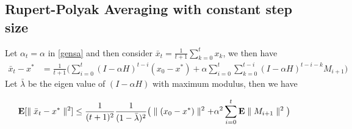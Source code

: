 \subsection{Rupert-Polyak Averaging with constant step size}
Let $\alpha_t=\alpha$ in \eqref{gensa} and then consider $\bar{x}_t=\frac{1}{t+1}\sum_{k=0}^t x_k$, we then have
\begin{align*}
\bar{x}_t-x^*&=\frac{1}{t+1}\big(\sum_{i=0}^t (I-\alpha H)^{t-i}(x_0-x^*)+\alpha \sum_{i=0}^t \sum_{k=0}^{t-i} (I-\alpha H)^{t-i-k} M_{i+1}\big)
\end{align*}
Let $\bar{\lambda}$ be the eigen value of $(I-\alpha H)$ with maximum modulus, then we have
\begin{comment}
\begin{align*}
\begin{split}
|\E[\bar{x}_t-x^*]|&=|\frac{1}{t+1}\big(\sum_{i=0}^t (I-\alpha H)^{t-i}(x_0-x^*)|\\
&\leq \frac{1}{t+1}\frac{1}{1-\bar{\lambda}}|x_0-x^*|
\end{split}
\end{align*}
\end{comment}
\begin{align}\label{rates}
\mathbf{E}[\parallel\bar{x}_t-x^*\parallel^2]&\leq\frac{1}{(t+1)^2}\frac{1}{(1-\bar{\lambda})^2} \big(\parallel(x_0-x^*)\parallel^2+ \alpha^2\sum_{i=0}^t \mathbf{E}\parallel M_{i+1}\parallel^2\big)
\end{align}
\begin{comment}
\begin{itemize}
\item When all eigen values of $H$ have positive real parts, then for diminishing step sizes \eqref{gensa} tracks the ODE $\dot{x}(t)=(g-Hx(t))$. Suppose the eigen value of $H$ with smallest real part, say $\mu$ had no imaginary component, then it dictates the asymptotic rate of the ODE. Similarly, the modulus of the eigen value dictates the rate at which the bias is forgotten in \eqref{rates}. Further, in the case when the eigen value of $H$ with smallest real part, say $\mu$ had no imaginary component, then the rate in \eqref{rates} is then dictated by $\bar{\lambda}=(I-\alpha\mu)$. 
\item Given that the rates with respect to time are the same for all the stochastic approximation schemes of the form \eqref{gensa}, algorithms can be designed using the following criteria:
\begin{enumerate}
\item Designing $H$ and $g$ so that $H^{-1}g$ is equal to the TD solution.
\item Designing a desirable value of $\bar{\lambda}$ since it plays a role both in the bias as well as noise terms. 
\end{enumerate}
\end{itemize}

\subsection{Optimal Step Size}
\end{comment}